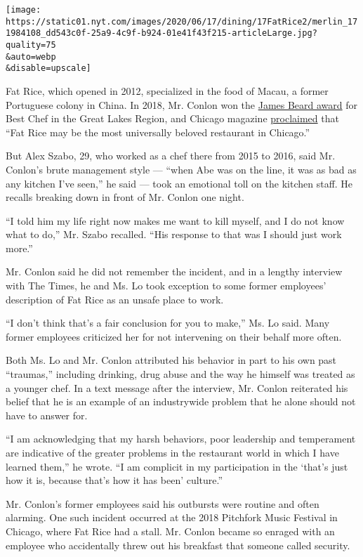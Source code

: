 \texttt{[image: https://static01.nyt.com/images/2020/06/17/dining/17FatRice2/merlin\_171984108\_dd543c0f-25a9-4c9f-b924-01e41f43f215-articleLarge.jpg?quality=75\\\&auto=webp\\\&disable=upscale]}

Fat Rice, which opened in 2012, specialized in the food of Macau, a
former Portuguese colony in China. In 2018, Mr. Conlon won the
\href{https://www.jamesbeard.org/chef/abraham-conlon}{James Beard award}
for Best Chef in the Great Lakes Region, and Chicago magazine
\href{https://www.chicagomag.com/dining-drinking/July-2018/The-50-Best-Restaurants-in-Chicago/Fat-Rice/}{proclaimed}
that ``Fat Rice may be the most universally beloved restaurant in
Chicago.''

But Alex Szabo, 29, who worked as a chef there from 2015 to 2016, said
Mr. Conlon's brute management style --- ``when Abe was on the line, it
was as bad as any kitchen I've seen,'' he said --- took an emotional
toll on the kitchen staff. He recalls breaking down in front of Mr.
Conlon one night.

``I told him my life right now makes me want to kill myself, and I do
not know what to do,'' Mr. Szabo recalled. ``His response to that was I
should just work more.''

Mr. Conlon said he did not remember the incident, and in a lengthy
interview with The Times, he and Ms. Lo took exception to some former
employees' description of Fat Rice as an unsafe place to work.

``I don't think that's a fair conclusion for you to make,'' Ms. Lo said.
Many former employees criticized her for not intervening on their behalf
more often.

Both Ms. Lo and Mr. Conlon attributed his behavior in part to his own
past ``traumas,'' including drinking, drug abuse and the way he himself
was treated as a younger chef. In a text message after the interview,
Mr. Conlon reiterated his belief that he is an example of an
industrywide problem that he alone should not have to answer for.

``I am acknowledging that my harsh behaviors, poor leadership and
temperament are indicative of the greater problems in the restaurant
world in which I have learned them,'' he wrote. ``I am complicit in my
participation in the `that's just how it is, because that's how it has
been' culture.''

Mr. Conlon's former employees said his outbursts were routine and often
alarming. One such incident occurred at the 2018 Pitchfork Music
Festival in Chicago, where Fat Rice had a stall. Mr. Conlon became so
enraged with an employee who accidentally threw out his breakfast that
someone called security.

